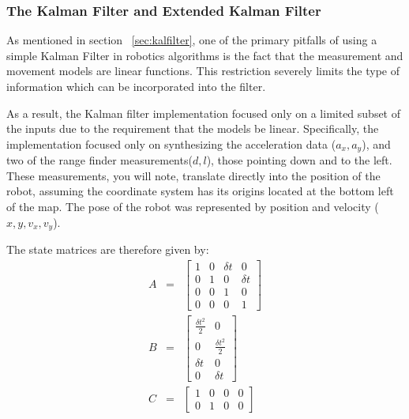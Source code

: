 \documentclass[english]{article}
\begin{document}
\subsubsection{The Kalman Filter and Extended Kalman Filter}
As mentioned in section ~\ref{sec:kalfilter}, one of the primary pitfalls of using a simple Kalman Filter in robotics algorithms is the fact that the measurement and movement models are linear functions. This restriction severely limits the type of information which can be incorporated into the filter.

As a result, the Kalman filter implementation focused only on a limited subset of the inputs due to the requirement that the models be linear. Specifically, the implementation focused only on synthesizing the acceleration data ($a_x, a_y$), and two of the range finder measurements($d, l$), those pointing down and to the left. These measurements, you will note, translate directly into the position of the robot, assuming the coordinate system has its origins located at the bottom left of the map. The pose of the robot was represented by position and velocity ($x, y, v_x, v_y$).

The state matrices are therefore given by:
\begin{eqnarray}
A &=& \left[ \begin{array}{cccc}
1 & 0 & \delta t & 0 \\
0 & 1 & 0 & \delta t \\
0 & 0 & 1 & 0 \\
0 & 0 & 0 & 1\end{array} \right] \\
B &=& \left[ \begin{array}{cc}
\frac{\delta t^2}{2} & 0 \\
0 & \frac{\delta t^2}{2} \\
\delta t & 0 \\
0 & \delta t \end{array} \right] \\
C &=& \left[ \begin{array}{cccc}
1 & 0 & 0 & 0 \\
0 & 1 & 0 & 0 \end{array} \right]
\end{eqnarray}
\end{document}

